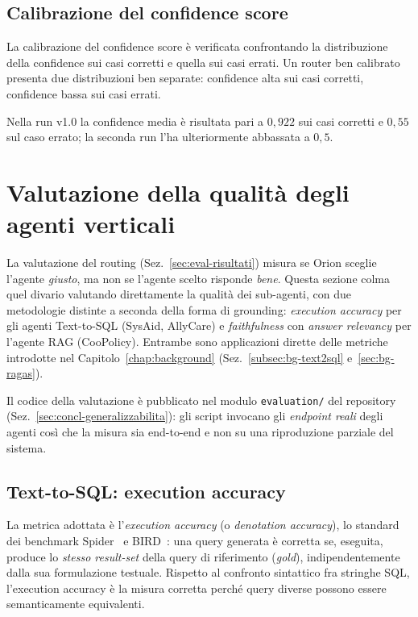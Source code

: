 \subsection{Calibrazione del confidence score}
\label{subsec:eval-confidence-cal}

La calibrazione del confidence score è verificata confrontando la distribuzione della confidence sui casi corretti e quella sui casi errati. 
Un router ben calibrato presenta due distribuzioni ben separate: confidence alta sui casi corretti, confidence bassa sui casi errati.

Nella run v1.0 la confidence media è risultata pari a $0{,}922$ sui casi corretti e $0{,}55$ sul caso errato;
la seconda run l'ha ulteriormente abbassata a $0{,}5$.

\section{Valutazione della qualità degli agenti verticali}
\label{sec:eval-agenti}

La valutazione del routing (Sez.~\ref{sec:eval-risultati}) misura se Orion sceglie l'agente \emph{giusto}, ma non se l'agente scelto risponde \emph{bene}. 
Questa sezione colma quel divario valutando direttamente la qualità dei sub-agenti, con due metodologie distinte a seconda della forma di grounding: 
\emph{execution accuracy} per gli agenti Text-to-SQL (SysAid, AllyCare) e \emph{faithfulness} con \emph{answer relevancy} per l'agente RAG (CooPolicy). 
Entrambe sono applicazioni dirette delle metriche introdotte nel Capitolo~\ref{chap:background} (Sez.~\ref{subsec:bg-text2sql} e~\ref{sec:bg-ragas}).

Il codice della valutazione è pubblicato nel modulo \texttt{evaluation/} del repository (Sez.~\ref{sec:concl-generalizzabilita}): 
gli script invocano gli \emph{endpoint reali} degli agenti così che la misura sia end-to-end e non su una riproduzione parziale del sistema.

\subsection{Text-to-SQL: execution accuracy}
\label{subsec:eval-text2sql}

La metrica adottata è l'\emph{execution accuracy} (o \emph{denotation accuracy}), lo standard dei benchmark Spider~\cite{yu2018spider} e 
BIRD~\cite{li2023bird}: una query generata è corretta se, eseguita, produce lo \emph{stesso result-set} della query di riferimento (\emph{gold}), 
indipendentemente dalla sua formulazione testuale. Rispetto al confronto sintattico fra stringhe SQL, l'execution accuracy è la misura corretta perché query 
diverse possono essere semanticamente equivalenti.

